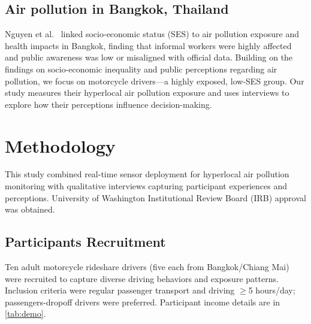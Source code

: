 \documentclass[sigconf,screen,natbib=true]{acmart}
\begin{document}
\subsection{Air pollution in Bangkok, Thailand}
Nguyen et al.~\cite{nguyen2023bangkokpollution} linked socio-economic status (SES) to air pollution exposure and health impacts in Bangkok, finding that informal workers were highly affected and public awareness was low or misaligned with official data.
Building on the findings on socio-economic inequality and public perceptions regarding air pollution, we focus on motorcycle drivers—a highly exposed, low-SES group.
Our study measures their hyperlocal air pollution exposure and uses interviews to explore how their perceptions influence decision-making.

 \section{Methodology}

This study combined real-time sensor deployment for hyperlocal air pollution monitoring with qualitative interviews capturing participant experiences and perceptions.
University of Washington Institutional Review Board (IRB) approval was obtained.

\subsection{Participants Recruitment}

Ten adult motorcycle rideshare drivers (five each from Bangkok/Chiang Mai) were recruited to capture diverse driving behaviors and exposure patterns.
Inclusion criteria were regular passenger transport and driving $\ge$5 hours/day; passengers-dropoff drivers were preferred.
Participant income details are in \autoref{tab:demo}.
\end{document}
